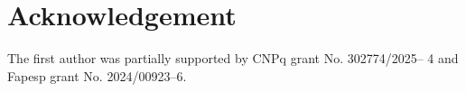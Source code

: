 \documentclass[a4paper,12pt]{amsart}
\def\cC{{\mathcal C}}
\numberwithin{equation}{section}
\theoremstyle{plain}
\numberwithin{thm}{section}
\newtheorem{remark}[thm]{Remark}
\begin{document}



















 \section*{Acknowledgement}
{The first author was partially supported by CNPq grant No. 302774/2025–
4 and Fapesp grant No. 2024/00923–6.
}
\end{document}

